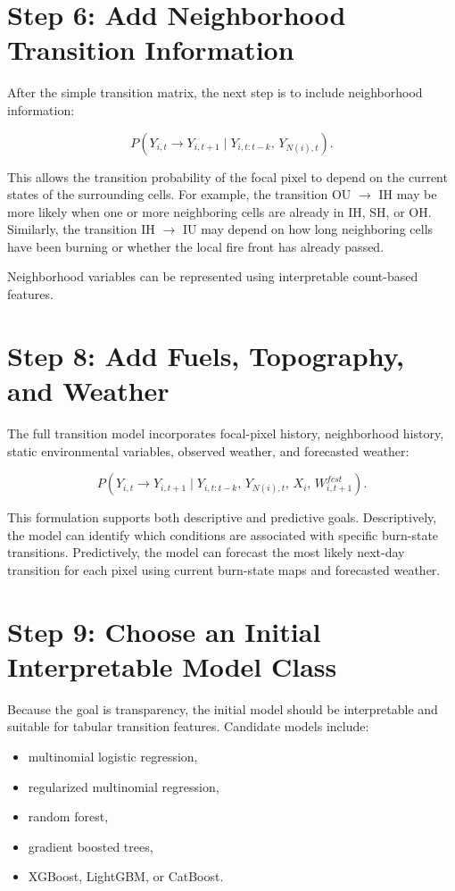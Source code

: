 \documentclass[11pt]{article}
\begin{document}
\section{Step 6: Add Neighborhood Transition Information}

After the simple transition matrix, the next step is to include neighborhood information:

\[
P\left(
Y_{i,t} \rightarrow Y_{i,t+1}
\mid
Y_{i,t:t-k},\,
Y_{N(i),t}
\right).
\]

This allows the transition probability of the focal pixel to depend on the current states of the surrounding cells. For example, the transition OU $\rightarrow$ IH may be more likely when one or more neighboring cells are already in IH, SH, or OH. Similarly, the transition IH $\rightarrow$ IU may depend on how long neighboring cells have been burning or whether the local fire front has already passed.

Neighborhood variables can be represented using interpretable count-based features.


\section{Step 8: Add Fuels, Topography, and Weather}

The full transition model incorporates focal-pixel history, neighborhood history, static environmental variables, observed weather, and forecasted weather:

\[
P\left(
Y_{i,t} \rightarrow Y_{i,t+1}
\mid
Y_{i,t:t-k},\,
Y_{N(i),t},\,
X_i,\,
W^{fcst}_{i,t+1}
\right).
\]

This formulation supports both descriptive and predictive goals. Descriptively, the model can identify which conditions are associated with specific burn-state transitions. Predictively, the model can forecast the most likely next-day transition for each pixel using current burn-state maps and forecasted weather.

\section{Step 9: Choose an Initial Interpretable Model Class}

Because the goal is transparency, the initial model should be interpretable and suitable for tabular transition features. Candidate models include:

\begin{itemize}
    \item multinomial logistic regression,
    \item regularized multinomial regression,
    \item random forest,
    \item gradient boosted trees,
    \item XGBoost, LightGBM, or CatBoost.
\end{itemize}
\end{document}
